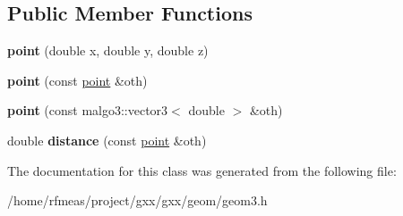 \subsection*{Public Member Functions}
\begin{DoxyCompactItemize}
\item 
{\bfseries point} (double x, double y, double z)\hypertarget{classgxx_1_1geom3_1_1point_adbd31ea74e2671a3c58217872435e162}{}\label{classgxx_1_1geom3_1_1point_adbd31ea74e2671a3c58217872435e162}

\item 
{\bfseries point} (const \hyperlink{classgxx_1_1geom3_1_1point}{point} \&oth)\hypertarget{classgxx_1_1geom3_1_1point_a2602f7539ffdfffaf245ba3f6f1d7105}{}\label{classgxx_1_1geom3_1_1point_a2602f7539ffdfffaf245ba3f6f1d7105}

\item 
{\bfseries point} (const malgo3\+::vector3$<$ double $>$ \&oth)\hypertarget{classgxx_1_1geom3_1_1point_a16ba4a85530db4077e309e5c4e638a01}{}\label{classgxx_1_1geom3_1_1point_a16ba4a85530db4077e309e5c4e638a01}

\item 
double {\bfseries distance} (const \hyperlink{classgxx_1_1geom3_1_1point}{point} \&oth)\hypertarget{classgxx_1_1geom3_1_1point_a6e6b9da4e949618442c67667ec385b65}{}\label{classgxx_1_1geom3_1_1point_a6e6b9da4e949618442c67667ec385b65}

\end{DoxyCompactItemize}


The documentation for this class was generated from the following file\+:\begin{DoxyCompactItemize}
\item 
/home/rfmeas/project/gxx/gxx/geom/geom3.\+h\end{DoxyCompactItemize}
